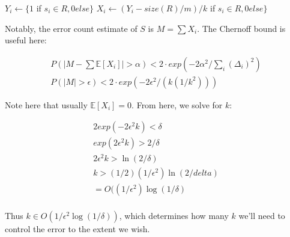 \documentclass[fleqn]{article}
\begin{document}
\begin{algorithmic}
\STATE $Y_i \gets \{1 $ if $s_i \in R, 0 else\}$
\STATE $X_i \gets (Y_i - size(R) / m) / k$ if $s_i \in R, 0 else\}$
\ENDFOR
\end{algorithmic}

Notably, the error count estimate of $S$ is $M = \sum X_i$. The Chernoff bound is useful here:

\begin{eqnarray*}
P(|M - \sum \mathbb{E}[X_i] | > \alpha) < 2 \cdot exp(-2 \alpha^2 / \sum_i (\Delta_i)^2) \\
P(|M| > \epsilon) < 2 \cdot exp(-2 \epsilon^2 / (k (1/k^2)))
\end{eqnarray*}

Note here that usually $\mathbb{E}[X_i] = 0$. From here, we solve for $k$:

\begin{eqnarray*}
2 exp(- 2 \epsilon^2 k) < \delta \\
exp(2 \epsilon^2 k) > 2/\delta \\
2 \epsilon^2 k > \ln(2/\delta) \\
k > (1/2) (1/\epsilon^2) \ln (2/delta) \\
= O((1/\epsilon^2) \log (1/\delta) \\
\end{eqnarray*}

Thus $k \in O(1/\epsilon^2 \log (1/\delta))$, which determines how many $k$ we'll need to control the error to the extent we wish.
\end{document}
